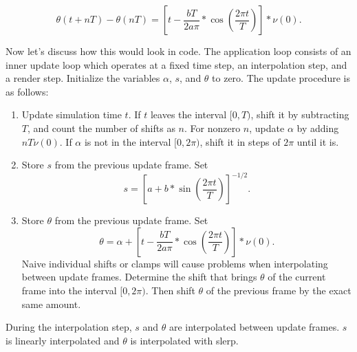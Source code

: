 \documentclass[a4paper,12pt]{book}
\begin{document}
\begin{equation*}
\theta(t + n T) - \theta(n T) = \left[t - \frac{b T}{2 a \pi} * \cos\left(\frac{2 \pi t}{T}\right) \right] * \nu(0).
\end{equation*}


Now let's discuss how this would look in code. 
The application loop consists of an inner update loop which operates at a fixed time step, an interpolation step, and a render step.
Initialize the variables $\alpha$, $s$, and $\theta$ to zero. The update procedure is as follows:

\begin{enumerate}
\item Update simulation time $t$.
If $t$ leaves the interval $[0, T)$, shift it by subtracting $T$, and count the number of shifts as $n$. For nonzero $n$, update $\alpha$ by adding $n T \nu(0)$. If $\alpha$ is not in the interval $[0, 2 \pi)$, shift it in steps of $2 \pi$ until it is.
\item Store $s$ from the previous update frame. Set 
\[ s = \left[ a + b * \sin\left(\frac{2 \pi t}{T}\right) \right]^{-1/2}. \]
\item Store $\theta$ from the previous update frame. Set 
\[ \theta = \alpha + \left[t - \frac{b T}{2 a \pi} * \cos\left(\frac{2 \pi t}{T}\right) \right] * \nu(0). \]
Naive individual shifts or clamps will cause problems when interpolating between update frames. Determine the shift that brings $\theta$ of the current frame into the interval $[0, 2 \pi)$. Then shift $\theta$ of the previous frame by the exact same amount.
\end{enumerate}

During the interpolation step, $s$ and $\theta$ are interpolated between update frames. $s$ is linearly interpolated and $\theta$ is interpolated with slerp.
\end{document}
